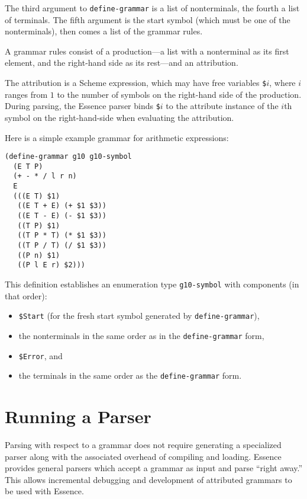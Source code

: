 \documentclass{article}
\newcommand{\codefont}[1]{\texttt{#1}}
\begin{document}
The third argument to \codefont{define-grammar} is a list of
nonterminals, the fourth a list of terminals.  The fifth argument is
the start symbol (which must be one of the nonterminals), then comes a
list of the grammar rules.

A grammar rules consist of a production---a list with a nonterminal as
its first element, and the right-hand side as its rest---and an
attribution.

The attribution is a Scheme expression, which may have free variables
\codefont{\$}$i$, where $i$ ranges from $1$ to the number of symbols
on the right-hand side of the production.  During parsing, the Essence
parser binds \codefont{\$}$i$ to the attribute instance of the $i$th
symbol on the right-hand-side when evaluating the attribution.

Here is a simple example grammar for arithmetic expressions:
%
\begin{verbatim}
(define-grammar g10 g10-symbol
  (E T P)
  (+ - * / l r n)
  E
  (((E T) $1)
   ((E T + E) (+ $1 $3))
   ((E T - E) (- $1 $3))
   ((T P) $1)
   ((T P * T) (* $1 $3))
   ((T P / T) (/ $1 $3))
   ((P n) $1)
   ((P l E r) $2)))
\end{verbatim}
%
This definition establishes an enumeration type \codefont{g10-symbol}
with components (in that order):
%
\label{list:grammar-enum}
%
\begin{itemize}
\item \codefont{\$Start} (for the fresh start symbol generated by
  \codefont{define-grammar}),
\item the nonterminals in the same order as in the
  \codefont{define-grammar} form,
\item \codefont{\$Error}, and
\item the terminals in the same order as the \codefont{define-grammar}
  form.
\end{itemize}

\section{Running a Parser}
\label{sec:running-a-parser}

Parsing with respect to a grammar does not require generating a
specialized parser along with the associated overhead of compiling and
loading.  Essence provides general parsers which accept a grammar as
input and parse ``right away.''  This allows incremental debugging and 
development of attributed grammars to be used with Essence.
\end{document}
